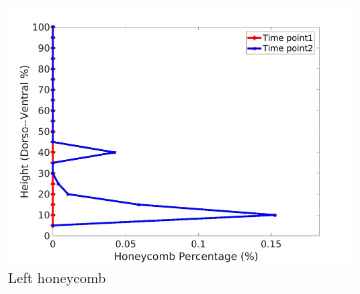 \begin{figure}[H]
\begin{subfigure}{.42\linewidth}
  \includegraphics[width=\linewidth,trim={{.0\wd0} {.0\wd0} {.0\wd0} {.0\wd0}},clip]{Appendix/Image_AppexA/DorsoToVentral/IPF14LeftLungHoneycombDiseaseDorsoToVentral.jpg} %
  \caption{Left honeycomb}
  \label{fig:IPF14DiseaseDorsoToVentral-e} 
\end{subfigure} 
\begin{subfigure}{.42\linewidth}%

\end{subfigure}
\end{figure}
